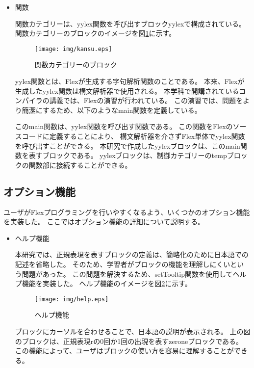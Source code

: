 \documentclass{risepaper}
\begin{document}
\begin{itemize}
\item 関数

関数カテゴリーは、yylex関数を呼び出すブロックyylexで構成されている。
関数カテゴリーのブロックのイメージを図\ref{fig:kansu}に示す。

\begin{figure}[h]
\begin{center}
\texttt{[image: img/kansu.eps]}
\end{center}%
\caption{関数カテゴリーのブロック}%
\label{fig:kansu}
\end{figure}%

yylex関数とは、Flexが生成する字句解析関数のことである。
本来、Flexが生成したyylex関数は構文解析器で使用される。
本学科で開講されているコンパイラの講義では、Flexの演習が行われている。
この演習では、問題をより簡潔にするため、以下のようなmain関数を定義している。


このmain関数は、yylex関数を呼び出す関数である。
この関数をFlexのソースコードに定義することにより、
構文解析器を介さずFlex単体でyylex関数を呼び出すことができる。
本研究で作成したyylexブロックは、このmain関数を表すブロックである。
yylexブロックは、制御カテゴリーのtempブロックの関数部に接続することができる。


\end{itemize}


\subsection{オプション機能}

ユーザがFlexプログラミングを行いやすくなるよう、いくつかのオプション機能を実装した。
ここではオプション機能の詳細について説明する。

\begin{itemize}
\item ヘルプ機能

本研究では、正規表現を表すブロックの定義は、簡略化のために日本語での記述を省略した。
そのため、学習者がブロックの機能を理解しにくいという問題があった。
この問題を解決するため、setTooltip関数を使用してヘルプ機能を実装した。
ヘルプ機能のイメージを図\ref{fig:help}に示す。

\begin{figure}[h]
\begin{center}
\texttt{[image: img/help.eps]}
\end{center}%
\caption{ヘルプ機能}%
\label{fig:help}
\end{figure}%

ブロックにカーソルを合わせることで、日本語の説明が表示される。
上の図のブロックは、正規表現rの0回か1回の出現を表すzeroneブロックである。
この機能によって、ユーザはブロックの使い方を容易に理解することができる。

\end{itemize}
\end{document}
